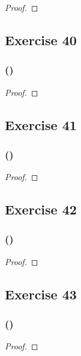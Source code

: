 \documentclass[14pt]{extarticle}
\begin{document}
\begin{proof}

\end{proof}

\subsection{Exercise 40}

\subsubsection{()}

\begin{proof}

\end{proof}

\subsection{Exercise 41}

\subsubsection{()}

\begin{proof}

\end{proof}

\subsection{Exercise 42}

\subsubsection{()}

\begin{proof}

\end{proof}

\subsection{Exercise 43}

\subsubsection{()}

\begin{proof}

\end{proof}
\end{document}
